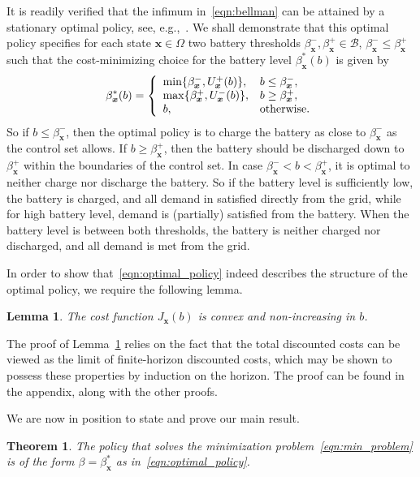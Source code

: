 \documentclass[journal]{IEEEtran}
\newcommand{\Bu}{\mathcal{B}}
\newcommand{\bfx}{\boldsymbol x}
\newcommand{\Uright}{U_{\bfx}^+(b)}
\newcommand{\Uleft}{U_{\bfx}^-(b)}
\newcommand\1{\mathbf{1}}
\newtheorem{lemma}{Lemma}
\newtheorem{theorem}{Theorem}
\begin{document}
It is readily verified that the infimum in~\eqref{eqn:bellman} can be attained by a stationary optimal policy, see, e.g.,~\cite[Proposition 4.4]{BS96}. We shall demonstrate that this optimal policy specifies for each state $\bfx \in \Omega$ two battery thresholds $\beta_{\bfx}^-,\beta_{\bfx}^+ \in \Bu$, $\beta_{\bfx}^- \le \beta_{\bfx}^+$ such that the cost-minimizing choice for the battery level $\beta_{\bfx}^*(b)$ is given by
\begin{equation}\label{eqn:optimal_policy}
\beta_{\bfx}^*(b) = \left\{
\begin{array}{ll}
\min\{\beta_{\bfx}^-, \Uright\}, & b \le \beta_{\bfx}^-,\\
\max\{\beta_{\bfx}^+, \Uleft\}, & b \ge \beta_{\bfx}^+,\\
b,  &   {\rm otherwise}.
\end{array}
\right.
\end{equation}
So if $b \le \beta_{\bfx}^-$, then the optimal policy is to charge the battery as close to $\beta_{\bfx}^-$ as the control set allows. If $b \ge \beta_{\bfx}^+$, then the battery should be discharged down to $\beta_{\bfx}^+$ within the boundaries of the control set. In case $\beta_{\bfx}^- < b < \beta_{\bfx}^+$, it is optimal to neither charge nor discharge the battery. So if the battery level is sufficiently low, the battery is charged, and all demand in satisfied directly from the grid, while for high battery level, demand is (partially) satisfied from the battery. When the battery level is between both thresholds, the battery is neither charged nor discharged, and all demand is met from the grid.

In order to show that~\eqref{eqn:optimal_policy} indeed describes the structure of the optimal policy, we require the following lemma.

\begin{lemma}\label{lem:cost_properties}
The cost function $J_{\bfx}(b)$ is convex and non-increasing in $b$.
\end{lemma}

The proof of Lemma~\ref{lem:cost_properties} relies on the fact that the total discounted costs can be viewed as the limit of finite-horizon discounted costs, which may be shown to possess these properties by induction on the horizon. The proof can be found in the appendix, along with the other proofs.


We are now in position to state and prove our main result.
\begin{theorem}\label{thm:optimal}
The policy that solves the minimization problem~\eqref{eqn:min_problem} is of the form $\beta = \beta_{\bfx}^*$  as in~\eqref{eqn:optimal_policy}.
\end{theorem}
\end{document}

